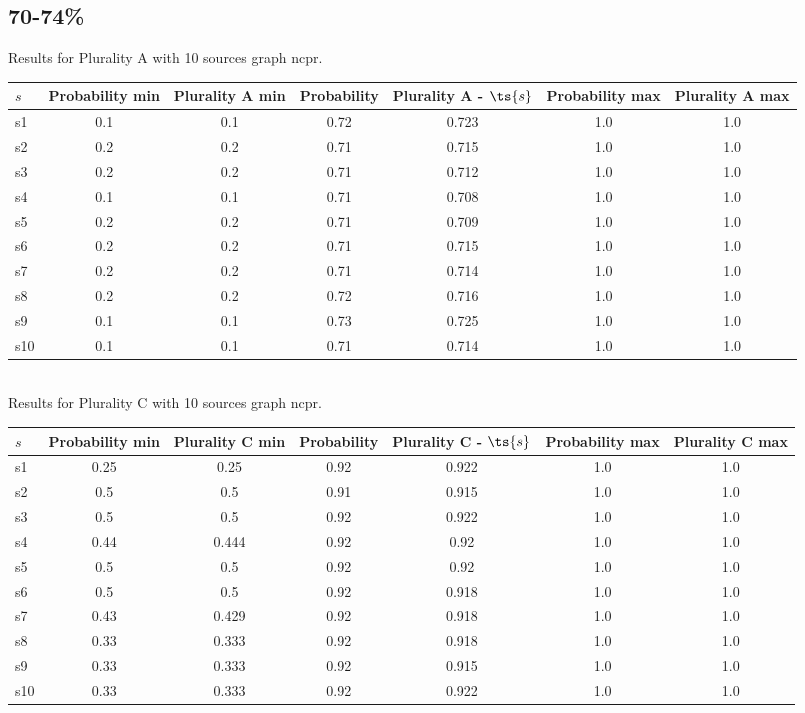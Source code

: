 \documentclass{article}
\begin{document}
\newpage

\subsection{70-74\%}

\noindent Results for Plurality A with 10 sources graph ncpr.

\noindent\begin{tabular}{|l|c|c|c|c|c|c|}
\hline
$s$& Probability min & Plurality A min & Probability & Plurality A - $\ts{s}$ & Probability max & Plurality A max\\
\hline
s1 &0.1 & 0.1 & 0.72 & 0.723 & 1.0 & 1.0\\
\hline
s2 &0.2 & 0.2 & 0.71 & 0.715 & 1.0 & 1.0\\
\hline
s3 &0.2 & 0.2 & 0.71 & 0.712 & 1.0 & 1.0\\
\hline
s4 &0.1 & 0.1 & 0.71 & 0.708 & 1.0 & 1.0\\
\hline
s5 &0.2 & 0.2 & 0.71 & 0.709 & 1.0 & 1.0\\
\hline
s6 &0.2 & 0.2 & 0.71 & 0.715 & 1.0 & 1.0\\
\hline
s7 &0.2 & 0.2 & 0.71 & 0.714 & 1.0 & 1.0\\
\hline
s8 &0.2 & 0.2 & 0.72 & 0.716 & 1.0 & 1.0\\
\hline
s9 &0.1 & 0.1 & 0.73 & 0.725 & 1.0 & 1.0\\
\hline
s10 &0.1 & 0.1 & 0.71 & 0.714 & 1.0 & 1.0\\
\hline
\end{tabular}\\

\noindent Results for Plurality C with 10 sources graph ncpr.

\noindent\begin{tabular}{|l|c|c|c|c|c|c|}
\hline
$s$& Probability min & Plurality C min & Probability & Plurality C - $\ts{s}$ & Probability max & Plurality C max\\
\hline
s1 &0.25 & 0.25 & 0.92 & 0.922 & 1.0 & 1.0\\
\hline
s2 &0.5 & 0.5 & 0.91 & 0.915 & 1.0 & 1.0\\
\hline
s3 &0.5 & 0.5 & 0.92 & 0.922 & 1.0 & 1.0\\
\hline
s4 &0.44 & 0.444 & 0.92 & 0.92 & 1.0 & 1.0\\
\hline
s5 &0.5 & 0.5 & 0.92 & 0.92 & 1.0 & 1.0\\
\hline
s6 &0.5 & 0.5 & 0.92 & 0.918 & 1.0 & 1.0\\
\hline
s7 &0.43 & 0.429 & 0.92 & 0.918 & 1.0 & 1.0\\
\hline
s8 &0.33 & 0.333 & 0.92 & 0.918 & 1.0 & 1.0\\
\hline
s9 &0.33 & 0.333 & 0.92 & 0.915 & 1.0 & 1.0\\
\hline
s10 &0.33 & 0.333 & 0.92 & 0.922 & 1.0 & 1.0\\
\hline
\end{tabular}\\
\end{document}
